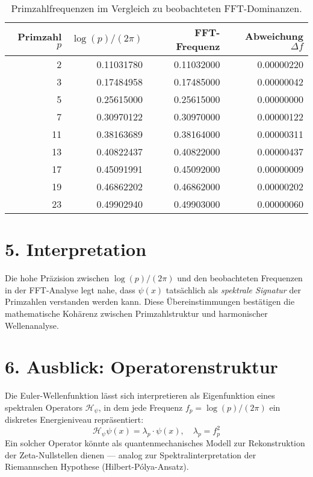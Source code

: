 \documentclass[12pt]{article}
\begin{document}
\begin{table}[H]
\centering
\renewcommand{\arraystretch}{1.2}
\begin{tabular}{rrrr}
\toprule
\textbf{Primzahl $p$} & \(\log(p)/(2\pi)\) & \textbf{FFT-Frequenz} & \textbf{Abweichung $\Delta f$} \\
\midrule
2  & 0.11031780 & 0.11032000 & 0.00000220 \\
3  & 0.17484958 & 0.17485000 & 0.00000042 \\
5  & 0.25615000 & 0.25615000 & 0.00000000 \\
7  & 0.30970122 & 0.30970000 & 0.00000122 \\
11 & 0.38163689 & 0.38164000 & 0.00000311 \\
13 & 0.40822437 & 0.40822000 & 0.00000437 \\
17 & 0.45091991 & 0.45092000 & 0.00000009 \\
19 & 0.46862202 & 0.46862000 & 0.00000202 \\
23 & 0.49902940 & 0.49903000 & 0.00000060 \\
\bottomrule
\end{tabular}
\caption{Primzahlfrequenzen im Vergleich zu beobachteten FFT-Dominanzen.}
\end{table}

\section*{5. Interpretation}

Die hohe Präzision zwischen \(\log(p)/(2\pi)\) und den beobachteten Frequenzen in der FFT-Analyse legt nahe, dass \(\psi(x)\) tatsächlich als \emph{spektrale Signatur} der Primzahlen verstanden werden kann. Diese Übereinstimmungen bestätigen die mathematische Kohärenz zwischen Primzahlstruktur und harmonischer Wellenanalyse.

\section*{6. Ausblick: Operatorenstruktur}

Die Euler-Wellenfunktion lässt sich interpretieren als Eigenfunktion eines spektralen Operators \(\mathcal{H}_\psi\), in dem jede Frequenz \(f_p = \log(p)/(2\pi)\) ein diskretes Energieniveau repräsentiert:
\[
\mathcal{H}_\psi \psi(x) = \lambda_p \cdot \psi(x), \quad \lambda_p = f_p^2
\]
Ein solcher Operator könnte als quantenmechanisches Modell zur Rekonstruktion der Zeta-Nullstellen dienen — analog zur Spektralinterpretation der Riemannschen Hypothese (Hilbert-Pólya-Ansatz).
\end{document}
